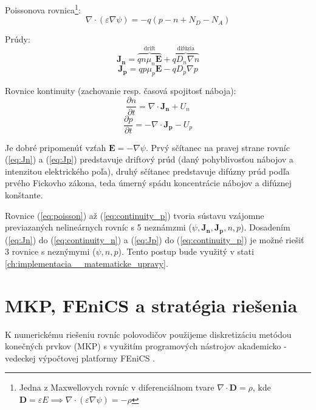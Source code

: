 \documentclass[a4paper, twoside, 12pt, onecolumn]{article}
\newcommand{\dxdtp}[2]{\frac{\partial #1}{\partial #2}}
\begin{document}
Poissonova rovnica\footnote{Jedna z Maxwellovych rovníc v diferenciálnom tvare \mbox{$\nabla \cdot \mathbf{D} = \rho$}, kde \mbox{$\mathbf{D} = \varepsilon E \implies \nabla \cdot (\varepsilon \nabla \psi) = - \rho$}}:
\begin{equation}
	\nabla \cdot (\varepsilon \nabla \psi) = -q (p -n + N_D - N_A)
	\label{eq:poisson}
\end{equation}

Prúdy:
\begin{equation}
	\mathbf{J_n} = \overbrace{q n \mu_n \mathbf{E}}^\text{drift} + \overbrace{q D_n \nabla n}^\text{difúzia}
	\label{eq:Jn}
\end{equation}
\begin{equation}
	\mathbf{J_p} = q p \mu_p \mathbf{E} - q D_p \nabla p
	\label{eq:Jp}
\end{equation}

Rovnice kontinuity (zachovanie resp. časová spojitosť náboja):
\begin{equation}
	\dxdtp{n}{t} = \nabla \cdot \mathbf{J_n} + U_n
	\label{eq:continuity_n}
\end{equation}
\begin{equation}
	\dxdtp{p}{t} = -\nabla \cdot \mathbf{J_p} - U_p
	\label{eq:continuity_p}
\end{equation}

Je dobré pripomenúť vzťah $\mathbf{E} = - \nabla \psi$. Prvý sčítanec na pravej strane rovníc (\ref{eq:Jn}) a (\ref{eq:Jp}) predstavuje driftový prúd (daný pohyblivosťou nábojov a intenzitou elektrického poľa), druhý sčítanec predstavuje difúzny prúd podľa prvého Fickovho zákona, teda úmerný spádu koncentrácie nábojov a difúznej konštante.

Rovnice (\ref{eq:poisson}) až (\ref{eq:continuity_p}) tvoria sústavu vzájomne previazaných nelineárnych rovníc s 5 neznámzmi ($\psi, \mathbf{J_n}, \mathbf{J_p}, n, p$). Dosadením (\ref{eq:Jn}) do (\ref{eq:continuity_n}) a (\ref{eq:Jp}) do (\ref{eq:continuity_p}) je možné riešiť 3 rovnice s neznýmymi ($\psi, n, p$). Tento postup bude využitý v stati \ref{ch:implementacia__matematicke_upravy}.


\section{MKP, FEniCS a stratégia riešenia}
K numerickému riešeniu rovníc polovodičov použijeme diskretizáciu metódou konečných prvkov (MKP) s využitím programových nástrojov akademicko - vedeckej výpočtovej platformy FEniCS \cite{fenicsproject}.
\end{document}
